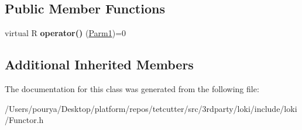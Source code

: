 \subsection*{Public Member Functions}
\begin{DoxyCompactItemize}
\item 
\hypertarget{classLoki_1_1FunctorImpl_3_01R_00_01LOKI__TYPELIST__1_07P1_08_00_01ThreadingModel_01_4_ab24f26990f02f7aa7eebf28525393636}{}virtual R {\bfseries operator()} (\hyperlink{classLoki_1_1EmptyType}{Parm1})=0\label{classLoki_1_1FunctorImpl_3_01R_00_01LOKI__TYPELIST__1_07P1_08_00_01ThreadingModel_01_4_ab24f26990f02f7aa7eebf28525393636}

\end{DoxyCompactItemize}
\subsection*{Additional Inherited Members}


The documentation for this class was generated from the following file\+:\begin{DoxyCompactItemize}
\item 
/\+Users/pourya/\+Desktop/platform/repos/tetcutter/src/3rdparty/loki/include/loki/Functor.\+h\end{DoxyCompactItemize}
